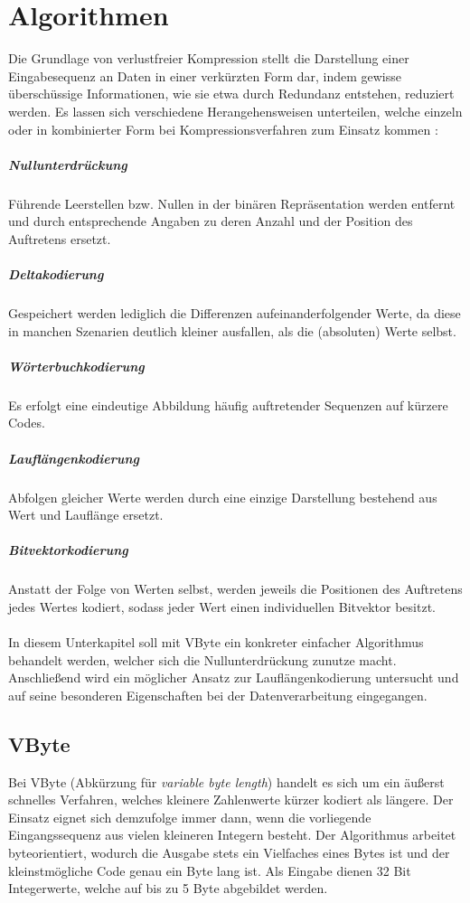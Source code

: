 
\section{Algorithmen}

Die Grundlage von verlustfreier Kompression stellt die Darstellung einer Eingabesequenz an Daten in einer verkürzten Form dar, indem gewisse überschüssige Informationen, wie sie etwa durch Redundanz entstehen, reduziert werden. Es lassen sich verschiedene Herangehensweisen unterteilen, welche einzeln oder in kombinierter Form bei Kompressionsverfahren zum Einsatz kommen \cite{Abadi2006}\cite{Croft2009}:

\subparagraph{Nullunterdrückung}
Führende Leerstellen bzw. Nullen in der binären Repräsentation werden entfernt und durch entsprechende Angaben zu deren Anzahl und der Position des Auftretens ersetzt.

\subparagraph{Deltakodierung}
Gespeichert werden lediglich die Differenzen aufeinanderfolgender Werte, da diese in manchen Szenarien deutlich kleiner ausfallen, als die (absoluten) Werte selbst.

\subparagraph{Wörterbuchkodierung}
Es erfolgt eine eindeutige Abbildung häufig auftretender Sequenzen auf kürzere Codes.

\subparagraph{Lauflängenkodierung}
Abfolgen gleicher Werte werden durch eine einzige Darstellung bestehend aus Wert und Lauflänge ersetzt.

\subparagraph{Bitvektorkodierung}
Anstatt der Folge von Werten selbst, werden jeweils die Positionen des Auftretens jedes Wertes kodiert, sodass jeder Wert einen individuellen Bitvektor besitzt.

\paragraph{}
In diesem Unterkapitel soll mit VByte ein konkreter einfacher Algorithmus behandelt werden, welcher sich die Nullunterdrückung zunutze macht. Anschließend wird ein möglicher Ansatz zur Lauflängenkodierung untersucht und auf seine besonderen Eigenschaften bei der Datenverarbeitung eingegangen.

\subsection{VByte}

Bei VByte (Abkürzung für \textit{variable byte length}) handelt es sich um ein äußerst schnelles Verfahren, welches kleinere Zahlenwerte kürzer kodiert als längere. Der Einsatz eignet sich demzufolge immer dann, wenn die vorliegende Eingangssequenz aus vielen kleineren Integern besteht. Der Algorithmus arbeitet byteorientiert, wodurch die Ausgabe stets ein Vielfaches eines Bytes ist und der kleinstmögliche Code genau ein Byte lang ist. Als Eingabe dienen 32 Bit Integerwerte, welche auf bis zu 5 Byte abgebildet werden.

